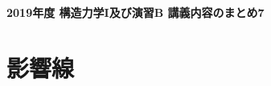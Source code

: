 \documentclass[10pt,a4j]{jarticle}
\newlength{\minitwocolumn}
\begin{document}
\newcommand{\fat}[1]{\mbox{\boldmath $#1$}}
\newcommand{\D}{\partial}
\newcommand{\w}{\omega}
\newcommand{\ga}{\alpha}
\newcommand{\gb}{\beta}
\newcommand{\gx}{\xi}
\newcommand{\gz}{\zeta}
\newcommand{\vhat}[1]{\hat{\fat{#1}}}
\newcommand{\spc}{\vspace{0.7\baselineskip}}
\newcommand{\halfspc}{\vspace{0.3\baselineskip}}

\newcommand{\twofig}[2]
 {
   \begin{figure}
     \begin{minipage}[t]{\minitwocolumn}
         \begin{center}   #1
         \end{center}
     \end{minipage}
         \hspace{\columnsep}
     \begin{minipage}[t]{\minitwocolumn}
         \begin{center} #2
         \end{center}
     \end{minipage}
   \end{figure}
 }
\begin{center}
	{\Large \bf 2019年度 構造力学I及び演習B 講義内容のまとめ7} \\
\end{center}
\section{影響線}
\end{document}

